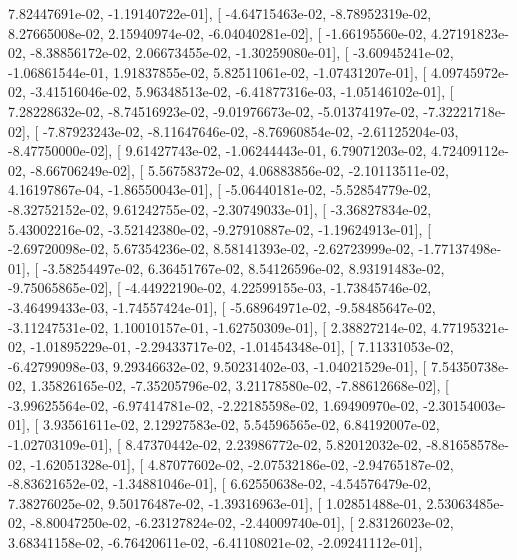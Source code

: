 \documentclass{article}
\begin{document}
          7.82447691e-02,  -1.19140722e-01],
       [ -4.64715463e-02,  -8.78952319e-02,   8.27665008e-02,
          2.15940974e-02,  -6.04040281e-02],
       [ -1.66195560e-02,   4.27191823e-02,  -8.38856172e-02,
          2.06673455e-02,  -1.30259080e-01],
       [ -3.60945241e-02,  -1.06861544e-01,   1.91837855e-02,
          5.82511061e-02,  -1.07431207e-01],
       [  4.09745972e-02,  -3.41516046e-02,   5.96348513e-02,
         -6.41877316e-03,  -1.05146102e-01],
       [  7.28228632e-02,  -8.74516923e-02,  -9.01976673e-02,
         -5.01374197e-02,  -7.32221718e-02],
       [ -7.87923243e-02,  -8.11647646e-02,  -8.76960854e-02,
         -2.61125204e-03,  -8.47750000e-02],
       [  9.61427743e-02,  -1.06244443e-01,   6.79071203e-02,
          4.72409112e-02,  -8.66706249e-02],
       [  5.56758372e-02,   4.06883856e-02,  -2.10113511e-02,
          4.16197867e-04,  -1.86550043e-01],
       [ -5.06440181e-02,  -5.52854779e-02,  -8.32752152e-02,
          9.61242755e-02,  -2.30749033e-01],
       [ -3.36827834e-02,   5.43002216e-02,  -3.52142380e-02,
         -9.27910887e-02,  -1.19624913e-01],
       [ -2.69720098e-02,   5.67354236e-02,   8.58141393e-02,
         -2.62723999e-02,  -1.77137498e-01],
       [ -3.58254497e-02,   6.36451767e-02,   8.54126596e-02,
          8.93191483e-02,  -9.75065865e-02],
       [ -4.44922190e-02,   4.22599155e-03,  -1.73845746e-02,
         -3.46499433e-03,  -1.74557424e-01],
       [ -5.68964971e-02,  -9.58485647e-02,  -3.11247531e-02,
          1.10010157e-01,  -1.62750309e-01],
       [  2.38827214e-02,   4.77195321e-02,  -1.01895229e-01,
         -2.29433717e-02,  -1.01454348e-01],
       [  7.11331053e-02,  -6.42799098e-03,   9.29346632e-02,
          9.50231402e-03,  -1.04021529e-01],
       [  7.54350738e-02,   1.35826165e-02,  -7.35205796e-02,
          3.21178580e-02,  -7.88612668e-02],
       [ -3.99625564e-02,  -6.97414781e-02,  -2.22185598e-02,
          1.69490970e-02,  -2.30154003e-01],
       [  3.93561611e-02,   2.12927583e-02,   5.54596565e-02,
          6.84192007e-02,  -1.02703109e-01],
       [  8.47370442e-02,   2.23986772e-02,   5.82012032e-02,
         -8.81658578e-02,  -1.62051328e-01],
       [  4.87077602e-02,  -2.07532186e-02,  -2.94765187e-02,
         -8.83621652e-02,  -1.34881046e-01],
       [  6.62550638e-02,  -4.54576479e-02,   7.38276025e-02,
          9.50176487e-02,  -1.39316963e-01],
       [  1.02851488e-01,   2.53063485e-02,  -8.80047250e-02,
         -6.23127824e-02,  -2.44009740e-01],
       [  2.83126023e-02,   3.68341158e-02,  -6.76420611e-02,
         -6.41108021e-02,  -2.09241112e-01],
\end{document}
